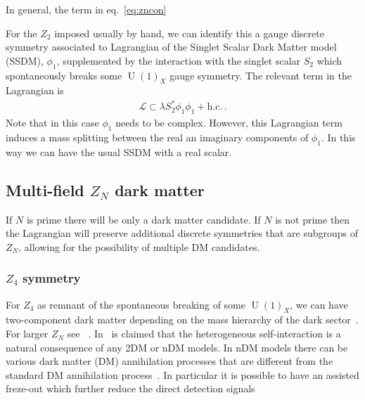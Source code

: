 \documentclass[prd,amsfonts,aps,nofootinbib,notitlepage,11pt,superscriptaddress]{revtex4-1}
\begin{document}
In general, the term in eq.~\eqref{eq:zncon}


For the $Z_2$ imposed usually by hand, we can identify this a gauge discrete symmetry associated to Lagrangian of the Singlet Scalar Dark Matter model (SSDM), $\phi_1$, supplemented by the interaction with the singlet scalar $S_2$ which spontaneously breaks some $\operatorname{U}(1)_X$ gauge symmetry. The relevant term in the Lagrangian is
\begin{align}
  \mathcal{L}\subset \lambda S_2^{*} \phi_1 \phi_1+ \text{h.c.}\,.
\end{align}
Note that in this case $\phi_1$  needs to be complex. However, this Lagrangian term induces a mass splitting between the real an imaginary components of $\phi_1$. In this way we can have the usual SSDM with a real scalar.




\subsection{Multi-field $Z_N$ dark matter}
If $N$ is prime there will be only a dark matter candidate.
If $N$ is not prime then the Lagrangian will preserve additional discrete symmetries that are subgroups of $Z_N$, allowing for the possibility of multiple DM candidates.

\subsubsection{$Z_4$ symmetry}




For $Z_4$ as remnant of the spontaneous breaking of some $\operatorname{U}(1)_X$,  we can have two-component dark matter depending on the mass hierarchy of the dark sector~\cite{Batell:2010bp,Aoki:2016glu}. For larger $Z_N$ see ~\cite{Batell:2010bp}. In~\cite{Chen:2018lsk} is claimed that the heterogeneous self-interaction is a natural consequence of any 2DM or nDM models. In nDM models there can be various dark matter (DM) annihilation processes that are different from the standard DM annihilation process~\cite{Aoki:2012ub}. In particular it is possible to have an assisted freze-out which further reduce the direct detection signals~\cite{Belanger:2011ww}



\end{document}
